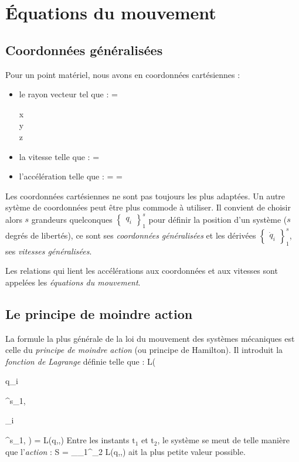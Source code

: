\chapter{\'Equations du mouvement}
\section{Coordonn\'ees g\'en\'eralis\'ees}

Pour un point mat\'eriel, nous avons en coordonn\'ees cart\'esiennes :
\begin{itemize}
\item le rayon vecteur tel que :
	\benn
		 = \begin{pmatrix} x \\ y \\ z \end{pmatrix}
	\eenn
\item la vitesse telle que :
	\benn
		 = 
	\eenn
\item l'acc\'el\'eration telle que :
	\benn
		 =  = 
	\eenn
\end{itemize}

Les coordonn\'ees cart\'esiennes ne sont pas toujours les plus adapt\'ees. Un autre syt\`eme de coordonn\'ees peut \^etre plus commode \`a utiliser. Il convient de choisir alors $s$ grandeurs quelconques $\begin{Bmatrix}q_{i}\end{Bmatrix}^{s}_{1}$ pour d\'efinir la position d'un syst\`eme ($s$ degr\'es de libert\'es), ce sont ses \emph{coordonn\'ees g\'en\'eralis\'ees} et les d\'eriv\'ees $\begin{Bmatrix}\dot{q}_{i}\end{Bmatrix}^{s}_{1}$, ses \emph{vitesses g\'en\'eralis\'ees}.

Les relations qui lient les acc\'el\'erations aux coordonn\'ees et aux vitesses sont appel\'ees les \emph{\'equations du mouvement}.

\section{Le principe de moindre action}

La formule la plus g\'en\'erale de la loi du mouvement des syst\`emes mécaniques est celle du \emph{principe de moindre action} (ou principe de Hamilton). Il introduit la \emph{fonction de Lagrange} d\'efinie telle que :
\benn
	L(\begin{Bmatrix}q_{i}\end{Bmatrix}^{s}_{1},\begin{Bmatrix}_{i}\end{Bmatrix}^{s}_{1}, ) = L(q,,)
\eenn
Entre les instants $\mathrm{t}_{1}$ et $\mathrm{t}_{2}$, le système se meut de telle mani\`ere que l'\emph{action} :
\be
	S = \int_{_{1}}^{_{2}} L(q,,)  \label{EQ:2_1}
\ee
ait la plus petite valeur possible.

